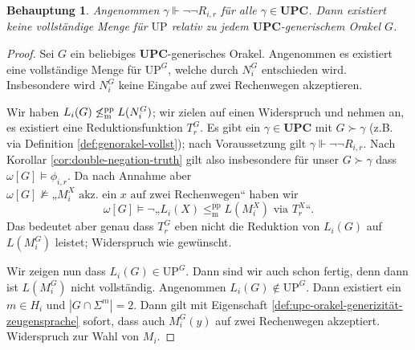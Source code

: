 \documentclass[nofonts]{uebung}
\newtheorem{claim}[theorem]{Behauptung}
\theoremstyle{definition}
\def\UP{\ensuremath{\mathrm{UP}}}
\DeclareMathOperator{\dom}{dom}
\def\leqmpp{\ensuremath{\leq_\mathrm{m}^\mathrm{pp}}}
\begin{document}
\begin{claim}
    Angenommen $\gamma\Vdash\neg\neg  R_{i,r}$ für alle $\gamma\in\mathbf{UPC}$.
    Dann existiert keine vollständige Menge für $\UP$ relativ zu jedem $\mathbf{UPC}$-generischem Orakel $G$.
\end{claim}
\begin{proof}
    Sei $G$ ein beliebiges $\mathbf{UPC}$-generisches Orakel.
    Angenommen es existiert eine vollständige Menge für $\UP^G$, welche durch $N^G_i$ entschieden wird.
    Insbesondere wird $N^G_i$ keine Eingabe auf zwei Rechenwegen akzeptieren.

    Wir haben $L_i(G)\not\leqmpp L(N^G_i)$; wir zielen auf einen Widerspruch und nehmen an, es existiert eine Reduktionsfunktion $T_r^G$.
    Es gibt ein $\gamma\in\mathbf{UPC}$ mit $G\succ\gamma$ (z.B. via Definition \ref{def:genorakel-vollst}); nach Voraussetzung gilt $\gamma\Vdash\neg\neg  R_{i,r}$.
    Nach Korollar \ref{cor:double-negation-truth} gilt also insbesondere für unser $G\succ\gamma$ dass $\omega[G] \vDash \phi_{i, r}$.
    Da nach Annahme aber $\omega[G] \not\vDash \text{„$M_i^X$ akz. ein $x$ auf zwei Rechenwegen“}$ haben wir
    \[ \omega[G] \vDash  \neg„L_{i}(X)\leqmpp L(M_i^X)\text{ via }T^X_r“. \]
    Das bedeutet aber genau dass $T^G_r$ eben nicht die Reduktion von $L_{i}(G)$ auf $L(M_i^G)$ leistet; Widerspruch wie gewünscht.

    Wir zeigen nun dass $L_i(G)\in\UP^G$. Dann sind wir auch schon fertig, denn dann ist $L(M_i^G)$ nicht vollständig.
    Angenommen $L_i(G)\not\in\UP^G$. Dann existiert ein $m\in H_i$ und $|G\cap \Sigma^m|= 2$.
    Dann gilt mit Eigenschaft \ref{def:upc-orakel-generizität-zeugensprache} sofort, dass auch $M_i^G(y)$ auf zwei Rechenwegen akzeptiert.
    Widerspruch zur Wahl von $M_i$.
\end{proof}
\end{document}
